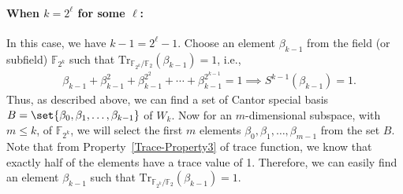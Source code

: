 

\paragraph{When $k=2^\ell$ for some $\ell$:} In this case, we have $k-1= 2^\ell-1$. Choose an element $\beta_{k-1}$ from the field (or subfield) $\mathbb{F}_{2^k}$ such that $\text{Tr}_{\mathbb{F}_{2^k}/\mathbb{F}_{2}}(\beta_{k-1})=1$,  i.e.,
\begin{equation}\label{Eqn:Trace_Cantorbasis}
	\begin{aligned}
		& \beta_{k-1}+ \beta_{k-1}^2+ \beta_{k-1}^{2^2}+\cdots + \beta_{k-1}^{2^{k-1}}=1 \implies S^{k-1}(\beta_{k-1})=1.
	\end{aligned}
\end{equation}
Thus, as described above, we can find a set of Cantor special basis $B=\set{\beta_0,\beta_1,\ldots,\beta_{k-1}}$ of $W_k$. Now for an $m$-dimensional subspace, with $m \leq k$, of $\mathbb{F}_{2^k}$, we will select the first $m$ elements $\beta_0,\beta_1,\ldots,\beta_{m-1}$ from the set $B$. Note that from Property~\ref{Trace-Property3} of trace function, we know that exactly half of the elements have a trace value of 1. Therefore, we can easily find an element $\beta_{k-1}$ such that $\text{Tr}_{\mathbb{F}_{2^k}/\mathbb{F}_{2}}(\beta_{k-1})=1$.


